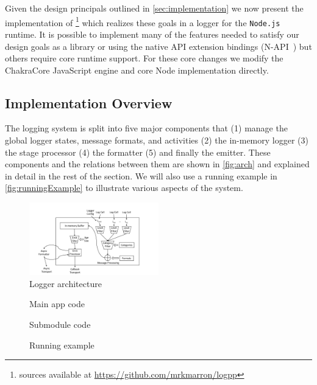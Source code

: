 Given the design principals outlined in \autoref{sec:implementation} we now 
present the implementation of \projn\footnote{\projn sources available at 
\url{https://github.com/mrkmarron/logpp}} which realizes these goals in a logger 
for the \texttt{Node.js}~\cite{Node} runtime. It is possible to implement many 
of the features needed to satisfy our design goals as a library or using the 
native API extension bindings (N-API~\cite{NAPI}) but others require core 
runtime support. For these core changes we modify the ChakraCore JavaScript 
engine and core Node implementation directly.

\subsection{Implementation Overview}
The logging system is split into five major components that (1) manage the 
global logger states, message formats, and activities (2) the in-memory logger 
(3) the stage processor (4) the formatter (5) and finally the emitter. These 
components and the relations between them are shown in \autoref{fig:arch} and 
explained in detail in the rest of the section. We will also use a running 
example in \autoref{fig:runningExample} to illustrate various aspects of the 
system.

\begin{figure}
    \centering
    \includegraphics[width=0.5\textwidth,angle=-90]{Figures/ArchDiagram}
    \caption{Logger architecture}
    \label{fig:arch}
\end{figure}

\begin{figure}[t]
\begin{minipage}[b]{0.47\textwidth}
     
    \caption{Main app code}
    \label{fig:appmain}
\end{minipage}
\begin{minipage}[b]{0.47\textwidth}
    
    \caption{Submodule code}
    \label{fig:appsub}
\end{minipage}
\caption{Running example}
\label{fig:runningExample}
\end{figure}

